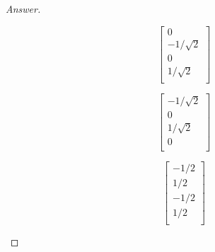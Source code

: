 \documentclass[../psets.tex]{subfiles}
\begin{document}
\begin{enumerate}
\begin{enumerate}
\begin{proof}[Answer]
\begin{figure}[h!]
\begin{subfigure}[b]{0.2\linewidth}
\begin{equation*}
                        \boxed{
                            \begin{bmatrix}
                                0\\
                                -1/\sqrt{2}\\
                                0\\
                                1/\sqrt{2}\\
                            \end{bmatrix}
                        }
                    \end{equation*}
                    \caption{}
                \end{subfigure}
                \begin{subfigure}[b]{0.2\linewidth}
                    \centering
                    \begin{equation*}
                        \boxed{
                            \begin{bmatrix}
                                -1/\sqrt{2}\\
                                0\\
                                1/\sqrt{2}\\
                                0\\
                            \end{bmatrix}
                        }
                    \end{equation*}
                    \caption{}
                \end{subfigure}
                \begin{subfigure}[b]{0.2\linewidth}
                    \centering
                    \begin{equation*}
                        \boxed{
                            \begin{bmatrix}
                                -1/2\\
                                1/2\\
                                -1/2\\
                                1/2\\
                            \end{bmatrix}
                        }
                    \end{equation*}
                    \caption{}
                \end{subfigure}
                \begin{subfigure}[b]{0.2\linewidth}

\end{subfigure}
\end{figure}
\end{proof}
\end{enumerate}
\end{enumerate}
\end{document}
